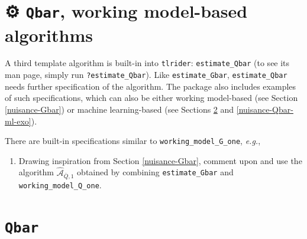 \documentclass[11pt,openright,twoside]{book}
\newenvironment{Shaded}{\begin{snugshade}}{\end{snugshade}}
\newcommand{\CommentTok}[1]{\textcolor[rgb]{0.56,0.35,0.01}{\textit{#1}}}
\newcommand{\NormalTok}[1]{#1}
\providecommand{\tightlist}{%
  \setlength{\itemsep}{0pt}\setlength{\parskip}{0pt}}
\newcommand{\gear}{\usebox{\gearbox}\;}
\newcommand{\Algo}{\widehat{\mathcal{A}}}
\newcommand{\Qbar}{\bar{Q}}
\theoremstyle{definition}
\theoremstyle{definition}
\theoremstyle{definition}
\theoremstyle{remark}
\begin{document}
\hypertarget{nuisance-Qbar-wm}{%
\section{\texorpdfstring{⚙ \gear \texttt{Qbar}, working model-based algorithms}{⚙ Qbar, working model-based algorithms}}\label{nuisance-Qbar-wm}}

A third template algorithm is built-in into \texttt{tlrider}: \texttt{estimate\_Qbar} (to see
its man page, simply run \texttt{?estimate\_Qbar}). Like \texttt{estimate\_Gbar},
\texttt{estimate\_Qbar} needs further specification of the algorithm. The package also
includes examples of such specifications, which can also be either working
model-based (see Section \ref{nuisance-Gbar}) or machine learning-based (see
Sections \ref{nuisance-Qbar} and \ref{nuisance-Qbar-ml-exo}).

There are built-in specifications similar to \texttt{working\_model\_G\_one}, \emph{e.g.},

\begin{Shaded}
\end{Shaded}

\begin{enumerate}
\def\labelenumi{\arabic{enumi}.}
\tightlist
\item
  Drawing inspiration from Section \ref{nuisance-Gbar}, comment upon and use
  the algorithm \(\Algo_{\Qbar,1}\) obtained by combining \texttt{estimate\_Gbar} and
  \texttt{working\_model\_Q\_one}.
\end{enumerate}


\hypertarget{nuisance-Qbar}{%
\section{\texorpdfstring{\texttt{Qbar}}{Qbar}}\label{nuisance-Qbar}}
\end{document}

